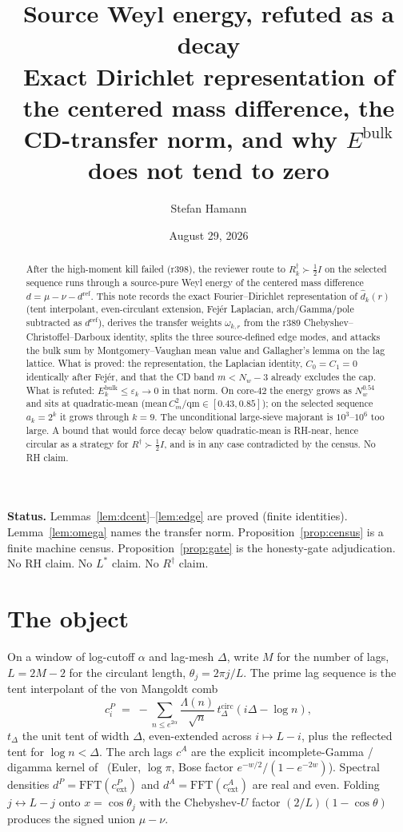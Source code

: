 \documentclass[11pt]{article}
\title{\bfseries Source Weyl energy, refuted as a decay\\[2mm]
\large Exact Dirichlet representation of the centered mass
difference, the CD-transfer norm, and why $E^{\mathrm{bulk}}$
does not tend to zero}
\author{Stefan Hamann}
\date{August 29, 2026}
\theoremstyle{remark}
\newcommand{\eps}{\varepsilon}
\newcommand{\dhat}{\widehat{d}}
\begin{document}
\maketitle

\begin{abstract}\noindent
After the high-moment kill failed (r398), the reviewer route
to $R^\dagger_k\succ\tfrac12 I$ on the selected sequence runs
through a source-pure Weyl energy of the centered mass
difference $d=\mu-\nu-d^{\mathrm{ref}}$.
This note records the exact Fourier--Dirichlet representation
of $\dhat_k(r)$ (tent interpolant, even-circulant extension,
Fej\'er Laplacian, arch/Gamma/pole subtracted as
$d^{\mathrm{ref}}$), derives the transfer weights
$\omega_{k,r}$ from the r389 Chebyshev--Christoffel--Darboux
identity, splits the three source-defined edge modes, and
attacks the bulk sum by Montgomery--Vaughan mean value and
Gallagher's lemma on the lag lattice.
What is proved: the representation, the Laplacian identity,
$C_0=C_1=0$ identically after Fej\'er, and that the CD band
$m<N_w-3$ already excludes the cap.
What is refuted: $E_k^{\mathrm{bulk}}\le\eps_k\to 0$ in that
norm.
On core-$42$ the energy grows as $N_w^{0.54}$ and sits at
quadratic-mean ($\mathrm{mean}\,C_m^2/\mathrm{qm}\in[0.43,0.85]$);
on the selected sequence $a_k=2^k$ it grows through $k=9$.
The unconditional large-sieve majorant is $10^3$--$10^6$ too
large.
A bound that would force decay below quadratic-mean is
RH-near, hence circular as a strategy for $R^\dagger\succ\tfrac12 I$,
and is in any case contradicted by the census.
No RH claim.
\end{abstract}

\medskip\noindent
\textbf{Status.}\enspace
Lemmas~\ref{lem:dcent}--\ref{lem:edge} are proved (finite
identities).
Lemma~\ref{lem:omega} names the transfer norm.
Proposition~\ref{prop:census} is a finite machine census.
Proposition~\ref{prop:gate} is the honesty-gate adjudication.
No RH claim.  No $L^*$ claim.  No $R^\dagger$ claim.

\section{The object}\label{sec:obj}

On a window of log-cutoff $\alpha$ and lag-mesh $\Delta$,
write $M$ for the number of lags, $L=2M-2$ for the circulant
length, $\theta_j=2\pi j/L$.
The prime lag sequence is the tent interpolant of the von
Mangoldt comb~\cite{v563,r283}
\begin{equation}\label{eq:cP}
c^P_i
\;=\;
-\sum_{n\le e^{2\alpha}}\frac{\Lambda(n)}{\sqrt n}\,
t_\Delta^{\mathrm{circ}}(i\Delta-\log n),
\end{equation}
$t_\Delta$ the unit tent of width $\Delta$, even-extended
across $i\mapsto L-i$, plus the reflected tent for
$\log n<\Delta$.
The arch lags $c^A$ are the explicit incomplete-Gamma /
digamma kernel of~\cite{v563} (Euler, $\log\pi$, Bose factor
$e^{-w/2}/(1-e^{-2w})$).
Spectral densities $d^P=\mathrm{FFT}(c^P_{\mathrm{ext}})$ and
$d^A=\mathrm{FFT}(c^A_{\mathrm{ext}})$ are real and even.
Folding $j\leftrightarrow L-j$ onto $x=\cos\theta_j$ with the
Chebyshev-$U$ factor $(2/L)(1-\cos\theta)$ produces the signed
union $\mu-\nu$.
\end{document}
